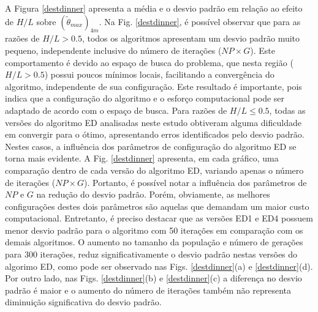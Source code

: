 \documentclass[12pt,A4,A4pt]{article}
\begin{document}
A Figura \ref{destdinner} apresenta a média e o desvio padrão em relação ao efeito de $H/L$ sobre $({\tilde{\theta}}_{max})_{4m}$. Na Fig. \ref{destdinner}, é possível observar que para as razões de $H/L>0.5$, todos os algoritmos apresentam um desvio padrão muito pequeno, independente inclusive do número de iterações ($NP \times G$). Este comportamento é devido ao espaço de busca do problema, que nesta região ($H/L>0.5$) possui poucos mínimos locais, facilitando a convergência do algoritmo, independente de sua configuração. Este resultado é importante, pois indica que a configuração do algoritmo e o esforço computacional pode ser adaptado de acordo com o espaço de busca. 
Para razões de $H/L\leqslant0.5$, todas as versões do algoritmo ED analisadas neste estudo obtiveram alguma dificuldade em convergir para o ótimo, apresentando erros identificados pelo desvio padrão. Nestes casos, a influência dos parâmetros de configuração do algoritmo ED se torna mais evidente. A Fig. \ref{destdinner} apresenta, em cada gráfico, uma comparação dentro de cada versão do algoritmo ED, variando apenas o número de iterações ($NP \times G$). Portanto, é possível notar a influência dos parâmetros de $NP$ e $G$ na redução do desvio padrão. Porém, obviamente, as melhores configurações destes dois parâmetros são aquelas que demandam um maior custo computacional. Entretanto, é preciso destacar que as versões ED1 e ED4 possuem menor desvio padrão para o algoritmo com 50 iterações em comparação com os demais algoritmos. O aumento no tamanho da população e número de gerações para 300 iterações, reduz significativamente o desvio padrão nestas versões do algorimo ED, como pode ser observado nas Figs. \ref{destdinner}(a) e \ref{destdinner}(d). Por outro lado, nas Figs. \ref{destdinner}(b) e \ref{destdinner}(c) a diferença no desvio padrão é maior e o aumento do número de iterações também não representa diminuição significativa do desvio padrão.
\end{document}

